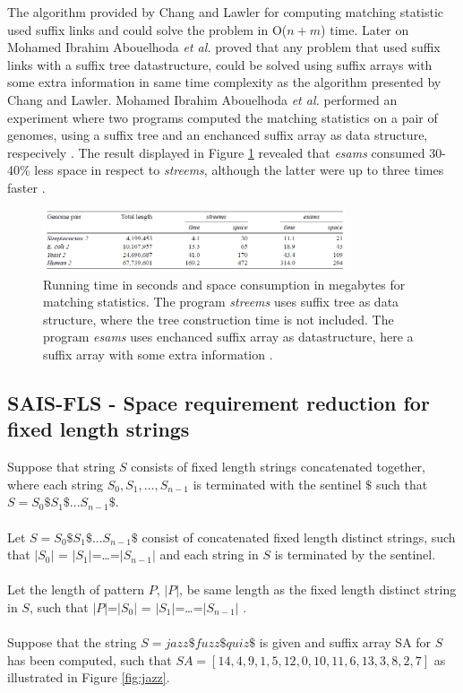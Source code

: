 \documentclass[12pt]{article} %
\begin{document}
The algorithm provided by Chang and Lawler \cite{enchancedsuffix} for computing matching statistic used suffix links and could solve the problem in O($n+m$) time. Later on Mohamed Ibrahim Abouelhoda \emph{et al.} \cite{enchancedsuffix} proved that any problem that used suffix links with a suffix tree datastructure, could be solved using suffix arrays with some extra information in same time complexity as the algorithm presented by Chang and Lawler\cite{enchancedsuffix}. Mohamed Ibrahim Abouelhoda \emph{et al.} performed an experiment where two programs computed the matching statistics on a pair of genomes, using a suffix tree and an enchanced suffix array as data structure, respecively \cite{enchancedsuffix}. The result displayed in Figure \ref{fig:matchingtest} revealed that \emph{esams} consumed 30-40\% less space in respect to \emph{streems}, although the latter were up to three times faster \cite{enchancedsuffix}.  

\begin{figure}[H]
    \centering
    \includegraphics[width=0.8\textwidth]{matchingtest}
    \captionsetup{width=0.8
    \textwidth}
    \caption{Running time in seconds and space consumption in megabytes for matching statistics. The program \emph{streems} uses suffix tree as data structure, where the tree construction time is not included. The program \emph{esams} uses enchanced suffix array as datastructure, here a suffix array with some extra information \cite{enchancedsuffix}. }
    \label{fig:matchingtest}
\end{figure}

\subsection{SAIS-FLS - Space requirement reduction for fixed length strings}

Suppose that string $S$ consists of fixed length strings concatenated together, where each string $S_0,S_1,...,S_{n-1}$ is terminated with the sentinel $\$$ such that $S=S_0\$S_1\$...S_{n-1}\$ $.
\\ \\
Let $S=S_0\$S_1\$...S_{n-1}\$ $ consist of concatenated fixed length distinct strings, such that $|S_0|$ = $|S_1|$=…=$|S_{n-1}|$ and each string in $S$ is terminated by the sentinel.
\\ \\
Let the length of pattern $P$, $|P|$, be same length as the fixed length distinct string in $S$, such that $|P|$=$|S_0|$ = $|S_1|$=…=$|S_{n-1}|$ .
\\ \\
Suppose that the string $S=jazz\$fuzz\$quiz\$$  is given and suffix array SA for $S$ has been computed, such that $SA=[14,4,9,1,5,12,0,10,11,6,13,3,8,2,7]$ as illustrated in Figure \ref{fig:jazz}.
\end{document}
